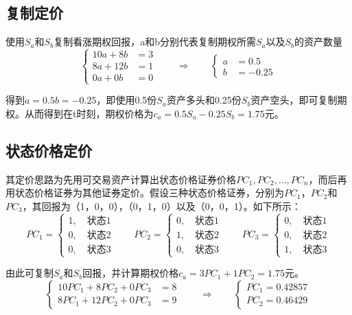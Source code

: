 \documentclass[11pt]{article}
\begin{document}
\subsection{复制定价}
使用$S_a$和$S_b$复制看涨期权回报，a和b分别代表复制期权所需$S_a$以及$S_b$的资产数量
\begin{equation*}
  \left\{
    \begin{aligned}
    10a+8b&=3 \\
    8a+12b&=1 \\
    0a+0b&=0
    \end{aligned}
  \right.
  \qquad
  \Rightarrow
  \qquad
  \left\{
    \begin{aligned}
    a&=0.5 \\
    b&=-0.25
    \end{aligned}\right.
\end{equation*}

得到$a=0.5 b=-0.25$，即使用0.5份$S_a$资产多头和0.25份$S_b$资产空头，即可复制期权。从而得到在t时刻，期权价格为$c_a=0.5S_a-0.25S_b=1.75$元。

\subsection{状态价格定价}

其定价思路为先用可交易资产计算出状态价格证券价格$PC_1,PC_2,\ldots,PC_n$，而后再用状态价格证券为其他证券定价。假设三种状态价格证券，分别为$PC_1$，$PC_2$和$PC_3$，其回报为（1，0，0），（0，1，0）以及（0，0，1）。如下所示：
\begin{equation*}
PC_1 = 
\left\{
\begin{aligned}
1, \quad \text{状态1} \\
0, \quad \text{状态2} \\
0, \quad \text{状态3} 
\end{aligned}\right.
\qquad
PC_2 = 
\left\{
\begin{aligned}
0, \quad \text{状态1} \\
1, \quad \text{状态2} \\
0, \quad \text{状态3} 
\end{aligned}\right.
\qquad
PC_3 = 
\left\{
\begin{aligned}
0, \quad \text{状态1} \\
0, \quad \text{状态2} \\
1, \quad \text{状态3} 
\end{aligned}\right.
\end{equation*}

由此可复制$S_a$和$S_b$回报，并计算期权价格$c_a=3 PC_{1} + 1 PC_2 =1.75$元。
\begin{equation*}
  \left\{
    \begin{aligned}
    10PC_1+8PC_2+0PC_3&=8 \\
    8PC_1+12PC_2+0PC_3&=9
    \end{aligned}
  \right.
  \qquad
  \Rightarrow
  \qquad
  \left\{
    \begin{aligned}
    PC_1 = 0.42857\\
    PC_2 = 0.46429
    \end{aligned}
  \right.
\end{equation*}
\end{document}
